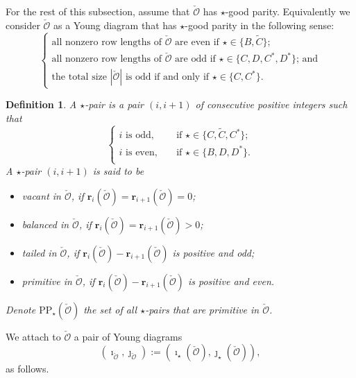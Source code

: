\documentclass[12pt,a4paper]{amsart}
\def\abs#1{\left|{#1}\right|}
\newcommand{\CO}{{\mathcal {O}}}
\numberwithin{equation}{section}
\newtheorem{defn}[thm]{Definition}
\theoremstyle{remark}
\begin{document}
For the rest of this subsection, assume that $\check \CO$ has  $\star$-good parity. Equivalently we consider $\check \CO$ as a Young diagram that has $\star$-good parity in the following sense:
\[
  \left\{ \begin{array}{l}
               \textrm{all nonzero row lengths of $\check \CO$ are even if $\star\in \{B, \widetilde{C}\}$;}\\
                     \textrm{all nonzero row lengths of $\check \CO$ are odd if $\star\in \{C, D, C^*, D^*\}$; and}\\
                        \textrm{the total size $\abs{\check \CO}$ is  odd if and only if $\star\in \{C, C^*\}$}.                   \end{array}
                 \right.
\]


\begin{defn}
 A $\star$-pair is a pair  $(i,i+1)$ of consecutive positive integers such that
\[
   \left\{
     \begin{array}{ll}
      i\textrm{ is odd}, \quad &\textrm{if $\star\in\{C, \widetilde{C}, C^*\}$};  \\
      i \textrm{ is even}, \quad &\textrm{if $\star\in\{B, D, D^*\}$}. \\
       \end{array}
   \right.
\]
A $\star$-pair   $(i,i+1)$ is said to be
\begin{itemize}
\item
vacant in $\check \CO$, if $\mathbf r_i(\check \CO)=\mathbf r_{i+1}(\check \CO)=0$;
\item
balanced in $\check \CO$,  if  $\mathbf r_i(\check \CO)=\mathbf r_{i+1}(\check \CO)>0$;
\item
tailed in $\check \CO$,  if  $\mathbf r_i(\check \CO)-\mathbf r_{i+1}(\check \CO)$ is positive and odd;
\item
primitive in $\check \CO$, if    $\mathbf r_i(\check \CO)-\mathbf r_{i+1}(\check \CO)$ is positive and even.
\end{itemize}
Denote $\mathrm{PP}_\star(\check \CO)$ the  set of all $\star$-pairs that are primitive in $\check \CO$.
\end{defn}

We attach to $\check \CO$ a pair of Young diagrams
\[
(\imath_{\check \CO}, \jmath_{\check \CO}):=(\imath_\star(\check \CO), \jmath_\star(\check \CO)),
\]
 as follows.
\end{document}
